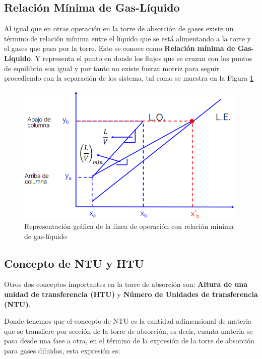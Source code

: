 \documentclass[11pt]{book}
\begin{document}
\subsection{Relación Mínima de Gas-Líquido}

Al igual que en otras operación en la torre de absorción de gases existe un término de relación mínima entre el líquido que se está alimentando a la torre y el gases que pasa por la torre. Esto se conoce como \textbf{Relación mínima de Gas-Líquido}. Y representa el punto en donde los flujos que se cruzan con los puntos de equilibrio son igual y por tanto no existe fuerza motriz para seguir procediendo con la separación de los sistema, tal como se muestra en la Figura \ref{fig:Absorcion_10}

\begin{figure}
    \centering
    \includegraphics{img/absorcion/Absorcion_10.PNG}
    \caption{Representación gráfica de la línea de operación con relación minima de gas-líquido}
    \label{fig:Absorcion_10}
\end{figure}

\subsection{Concepto de NTU y HTU}

Otros dos conceptos importantes en la torre de absorción son: \textbf{Altura de una unidad de transferencia (HTU)} y \textbf{Número de Unidades de transferencia (NTU)}. 

Donde tenemos que el concepto de NTU es la cantidad adimensional de materia que se transfiere por sección de la torre de absorción, es decir, cuanta materia se pasa desde una fase a otra, en el término de la expresión de la torre de absorción para gases diluidos, esta expresión es:
\end{document}

